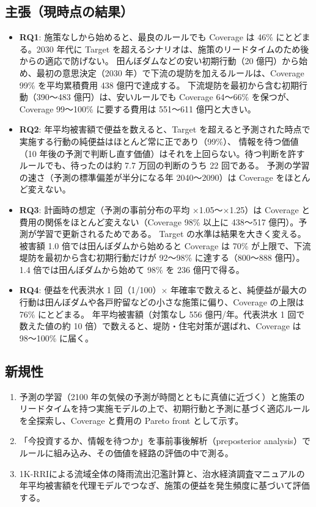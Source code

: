 \documentclass[a4paper,10pt]{ltjsarticle}
\begin{document}
\subsection{主張（現時点の結果）}
\begin{itemize}
  \item \textbf{RQ1}: 施策なしから始めると、最良のルールでも Coverage は 46\% にとどまる。2030 年代に Target を超えるシナリオは、施策のリードタイムのため後からの適応で防げない。
    田んぼダムなどの安い初期行動（20 億円）から始め、最初の意思決定（2030 年）で下流の堤防を加えるルールは、Coverage 99\% を平均累積費用 438 億円で達成する。
    下流堤防を最初から含む初期行動（390〜483 億円）は、安いルールでも Coverage 64〜66\% を保つが、Coverage 99〜100\% に要する費用は 551〜611 億円と大きい。
  \item \textbf{RQ2}: 年平均被害額で便益を数えると、Target を超えると予測された時点で実施する行動の純便益はほとんど常に正であり（99\%）、
    情報を待つ価値（10 年後の予測で判断し直す価値）はそれを上回らない。待つ判断を許すルールでも、待ったのは約 7.7 万回の判断のうち 22 回である。
    予測の学習の速さ（予測の標準偏差が半分になる年 2040〜2090）は Coverage をほとんど変えない。
  \item \textbf{RQ3}: 計画時の想定（予測の事前分布の平均 ×1.05〜×1.25）は Coverage と費用の関係をほとんど変えない（Coverage 98\% 以上に 438〜517 億円）。予測が学習で更新されるためである。
    Target の水準は結果を大きく変える。被害額 1.0 倍では田んぼダムから始めると Coverage は 70\% が上限で、下流堤防を最初から含む初期行動だけが 92〜98\% に達する（800〜888 億円）。
    1.4 倍では田んぼダムから始めて 98\% を 236 億円で得る。
  \item \textbf{RQ4}: 便益を代表洪水 1 回（1/100）× 年確率で数えると、純便益が最大の行動は田んぼダムや各戸貯留などの小さな施策に偏り、Coverage の上限は 76\% にとどまる。
    年平均被害額（対策なし 556 億円/年。代表洪水 1 回で数えた値の約 10 倍）で数えると、堤防・住宅対策が選ばれ、Coverage は 98〜100\% に届く。
\end{itemize}

\subsection{新規性}
\begin{enumerate}
  \item 予測の学習（2100 年の気候の予測が時間とともに真値に近づく）と施策のリードタイムを持つ実施モデルの上で、初期行動と予測に基づく適応ルールを全探索し、Coverage と費用の Pareto front として示す。
  \item 「今投資するか、情報を待つか」を事前事後解析（preposterior analysis）\cite{raiffa1961}でルールに組み込み、その価値を経路の評価の中で測る。
  \item 1K-RRI\cite{sugawara2024}による流域全体の降雨流出氾濫計算と、治水経済調査マニュアル\cite{mlit_manual}の年平均被害額を代理モデルでつなぎ、施策の便益を発生頻度に基づいて評価する。
\end{enumerate}
\end{document}
